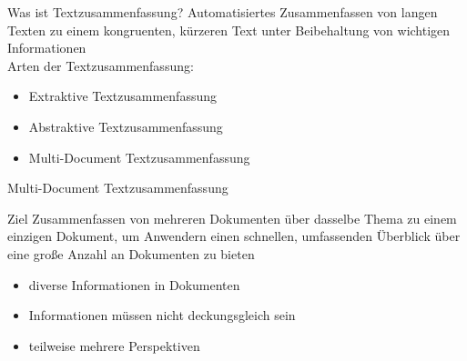 

\begin{frame}{Was ist Textzusammenfassung?}
  Automatisiertes Zusammenfassen von langen Texten zu einem kongruenten, kürzeren Text unter Beibehaltung von wichtigen Informationen 
  \\[0.5cm]
  Arten der Textzusammenfassung:
  \begin{itemize}
      \item Extraktive Textzusammenfassung
      \item Abstraktive Textzusammenfassung
      \item Multi-Document Textzusammenfassung
  \end{itemize}
\end{frame}

\begin{frame}{Multi-Document Textzusammenfassung}
  \begin{exampleblock}{Ziel}
    Zusammenfassen von mehreren Dokumenten über dasselbe Thema zu einem einzigen Dokument, um Anwendern einen schnellen, umfassenden Überblick über eine große Anzahl an Dokumenten zu bieten
  \end{exampleblock}
  \begin{itemize}
      \item diverse Informationen in Dokumenten
      \item Informationen müssen nicht deckungsgleich sein
      \item teilweise mehrere Perspektiven
  \end{itemize}
\end{frame}


